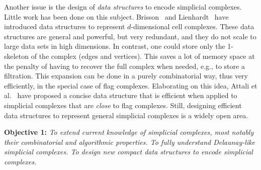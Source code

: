  
Another issue is the  design of {\em data structures } to encode simplicial complexes.
Little work has been done on this subject. Brisson~\cite{Brisson:1989:RGS:73833.73858} and
Lienhardt~\cite{DBLP:journals/ijcga/Lienhardt94} have introduced data
structures to represent $d$-dimensional cell complexes. These data
structures are general and powerful, but very redundant, and they do
not scale to large data sets in high dimensions.  In contrast, one
could store only the 1-skeleton of the complex (edges and vertices). This 
saves a lot of memory space at the penalty of having to recover the full complex when needed, e.g., to store a filtration. This expansion can be done in a purely combinatorial way, thus very efficiently, in the special case of flag complexes. Elaborating on this idea, Attali et al.~\cite{Attali2011} have proposed a concise data structure that is efficient when applied to simplicial complexes that are {\em close} to flag complexes. Still, designing efficient data structures to represent general simplicial complexes is a widely open area.


\vspace{2mm}

{\bf Objective 1:} {\em 
To extend  current knowledge of simplicial complexes, most notably their combinatorial and algorithmic properties.   To fully understand Delaunay-like simplicial complexes.  To design new  compact data structures to encode simplicial complexes.}

